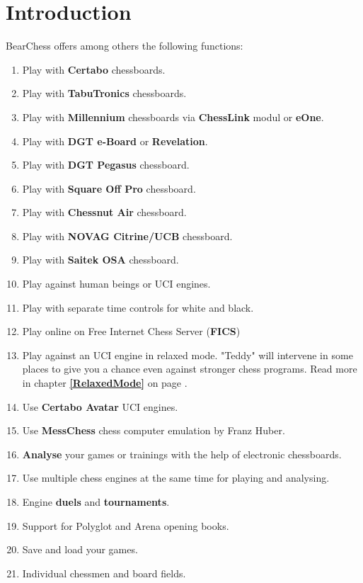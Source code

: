 \documentclass[11pt,a4paper]{article}
\begin{document}
\section{Introduction}
BearChess offers among others the following functions:
\begin{enumerate}
	  \item Play with \textbf{Certabo} chessboards.
	  \item Play with \textbf{TabuTronics} chessboards.	  
	  \item Play with \textbf{Millennium} chessboards via \textbf{ChessLink} modul or \textbf{eOne}.
 	  \item Play with \textbf{DGT e-Board} or \textbf{Revelation}.	  
	  \item Play with \textbf{DGT Pegasus} chessboard.	  
	  \item Play with \textbf{Square Off Pro} chessboard.	  	  
	  \item Play with \textbf{Chessnut Air} chessboard.	  	  	  
	  \item Play with \textbf{NOVAG Citrine/UCB} chessboard.
	  \item Play with \textbf{Saitek OSA} chessboard.	  
  	  \item Play against human beings or UCI engines.
  	  \item Play with separate time controls for white and black.
  	  \item Play online on Free Internet Chess Server (\textbf{FICS})
  	  \item Play against an UCI engine in relaxed mode. "Teddy" will intervene in some places to give you a chance even against stronger chess programs. Read more in chapter \textbf{\ref{RelaxedMode}  } on page \pageref{RelaxedMode}.  	  
  	  \item Use \textbf{Certabo Avatar} UCI engines.  	  
  	  \item Use \textbf{MessChess} chess computer emulation by Franz Huber.  	    	  
  	  \item \textbf{Analyse} your games or trainings with the help of electronic chessboards.
  	  \item Use multiple chess engines at the same time for playing and analysing.
  	  \item Engine \textbf{duels} and \textbf{tournaments}.
  	  \item Support for Polyglot and Arena opening books.
  	  \item Save and load your games.
  	  \item Individual chessmen and board fields.
\end{enumerate}
\end{document}
